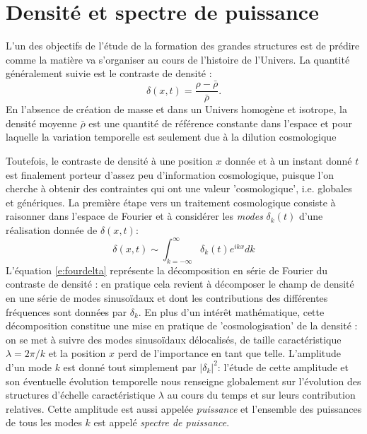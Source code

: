 \section{Densité et spectre de puissance}
L'un des objectifs de l'étude de la formation des grandes structures est de prédire comme la matière va s'organiser au cours de l'histoire de l'Univers. La quantité généralement suivie est le contraste de densité :
\begin{equation}
\delta(x,t) =\frac{\rho-\bar\rho}{\bar\rho}.
\end{equation}
En l'absence de création de masse et dans un Univers homogène et isotrope, la densité moyenne $\bar{\rho}$ est une quantité de référence constante dans l'espace et pour laquelle la variation temporelle est seulement due à la dilution cosmologique 

Toutefois, le contraste de densité à une position $x$ donnée et à un instant donné $t$ est finalement porteur d'assez peu d'information cosmologique, puisque l'on cherche à obtenir des contraintes qui ont une valeur 'cosmologique', i.e. globales et génériques. La première étape vers un traitement cosmologique consiste à raisonner dans l'espace de Fourier et à considérer les \textit{modes} $\delta_k(t)$ d'une réalisation donnée de $\delta(x,t)$:
\begin{equation}
\delta(x,t)\sim\int_{k=-\infty}^\infty \delta_k(t) e^{ikx} dk
\label{e:fourdelta}
\end{equation}
L'équation \ref{e:fourdelta} représente la décomposition en série de Fourier du contraste de densité : en pratique cela revient à décomposer le champ de densité en une série de modes sinusoïdaux et dont les contributions des différentes fréquences sont données par $\delta_k$. En plus d'un intérêt mathématique, cette décomposition constitue une mise en pratique de 'cosmologisation' de la densité : on se met à suivre des modes sinusoïdaux délocalisés, de taille caractéristique $\lambda=2\pi/k$ et la position $x$ perd de l'importance en tant que telle. L'amplitude d'un mode $k$ est donné tout simplement par $|\delta_k|^2$: l'étude de cette amplitude et son éventuelle évolution temporelle nous renseigne globalement sur l'évolution des structures d'échelle caractéristique $\lambda$ au cours du temps et sur leurs contribution relatives. Cette amplitude est aussi appelée \textit{puissance} et l'ensemble des puissances de tous les modes $k$ est appelé \textit{spectre de puissance}.

